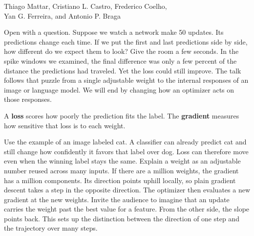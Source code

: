 {
\vspace{1mm}
\vspace{7mm}
\vspace{7mm}\par\small Thiago Mattar, Cristiano L. Castro, Frederico Coelho,\\ Yan G. Ferreira, and Antonio P. Braga}
{Open with a question. Suppose we watch a network make 50 updates. Its predictions change each time. If we put the first and last predictions side by side, how different do we expect them to look? Give the room a few seconds. In the spike windows we examined, the final difference was only a few percent of the distance the predictions had traveled. Yet the loss could still improve. The talk follows that puzzle from a single adjustable weight to the internal responses of an image or language model. We will end by changing how an optimizer acts on those responses.}

{
{\par A \textbf{loss} scores how poorly the prediction fits the label. The \textbf{gradient} measures how sensitive that loss is to each weight.}
\vspace{5mm}}
{Use the example of an image labeled cat. A classifier can already predict cat and still change how confidently it favors that label over dog. Loss can therefore move even when the winning label stays the same. Explain a weight as an adjustable number reused across many inputs. If there are a million weights, the gradient has a million components. Its direction points uphill locally, so plain gradient descent takes a step in the opposite direction. The optimizer then evaluates a new gradient at the new weights. Invite the audience to imagine that an update carries the weight past the best value for a feature. From the other side, the slope points back. This sets up the distinction between the direction of one step and the trajectory over many steps.}

